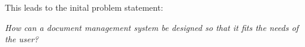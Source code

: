 This leads to the inital problem statement:

\begin{center}
\textit{How can a document management system be designed so that it fits the needs of the user?}
\end{center}
